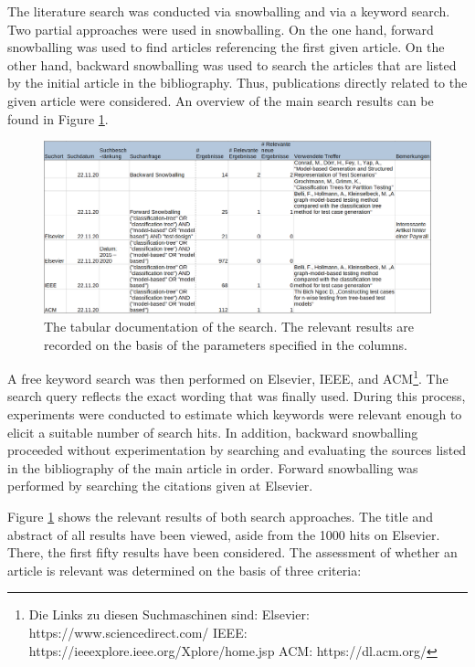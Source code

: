 The literature search was conducted via snowballing and via a keyword search. Two partial approaches were used in snowballing. On the one hand, forward snowballing was used to find articles referencing the first given article. On the other hand, backward snowballing was used to search the articles that are listed by the initial article in the bibliography. Thus, publications directly related to the given article were considered. An overview of the main search results can be found in Figure \ref{fig:literature_search}. 

\begin{figure}[H]
\centering
\includegraphics[scale=0.32]{../../individual/groeger/images/Suchdokumentation.png} 
\caption{The tabular documentation of the search. The relevant results are recorded on the basis of the parameters specified in the columns.}
\label{fig:literature_search}
\end{figure}

A free keyword search was then performed on Elsevier, IEEE, and ACM\footnote{Die Links zu diesen Suchmaschinen sind: Elsevier: https://www.sciencedirect.com/ IEEE: https://ieeexplore.ieee.org/Xplore/home.jsp ACM: https://dl.acm.org/ }. The search query reflects the exact wording that was finally used. During this process, experiments were conducted to estimate which keywords were relevant enough to elicit a suitable number of search hits. In addition, backward snowballing proceeded without experimentation by searching and evaluating the sources listed in the bibliography of the main article in order. Forward snowballing was performed by searching the citations given at Elsevier.

Figure \ref{fig:literature_search} shows the relevant results of both search approaches. The title and abstract of all results have been viewed, aside from the 1000 hits on Elsevier. There, the first fifty results have been considered. The assessment of whether an article is relevant was determined on the basis of three criteria:

